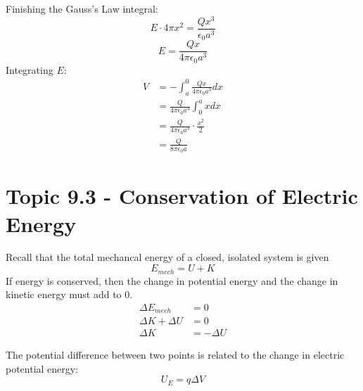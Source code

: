 \documentclass[12pt, titlepage]{article}
\begin{document}
\begin{Problem}
    Finishing the Gauss's Law integral:
    \begin{equation*}
        E \cdot 4 \pi x^2 = \frac{Qx^3}{\epsilon_0 a^3}
    \end{equation*}
    \begin{equation*}
        E = \frac{Qx}{4 \pi \epsilon_0 a^3}   
    \end{equation*}
    Integrating $E$:
    \begin{equation*}
        \begin{split}
            V &= -\int_{a}^{0} \frac{Qx}{4 \pi \epsilon_0 a^3} dx \\
            & = \frac{Q}{4 \pi \epsilon_0 a^3} \int_{0}^{a} x dx \\
            & = \frac{Q}{4 \pi \epsilon_0 a^3} \cdot \frac{x^2}{2} \\
            & = \frac{Q}{8 \pi \epsilon_0 a}
        \end{split}
    \end{equation*}
\end{Problem}

\section*{Topic 9.3 - Conservation of Electric Energy}

Recall that the total mechancal energy of a closed, isolated system is given 
\begin{equation*}
    E_{mech} = U + K
\end{equation*}
If energy is conserved, then the change in potential energy and the change in kinetic energy must add to 0. 
\begin{equation*}
    \begin{split}
        \Delta E_{mech} &= 0 \\
        \Delta K + \Delta U &= 0 \\
        \Delta K &= -\Delta U
    \end{split}
\end{equation*}

The potential difference between two points is related to the change in electric potential energy:
\begin{equation*}
    U_E = q\Delta V
\end{equation*}
\end{document}

